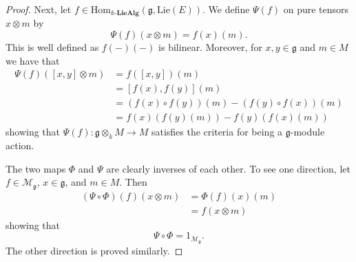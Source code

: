 \begin{proof}
  Next, let $ f \in \text{Hom}_{k\text{-}\mathbf{LieAlg}}(\mathfrak{g}, \text{Lie}(E)) $. We define $ \Psi(f) $ on pure tensors $ x \otimes m $ by
  \begin{equation}
    \Psi(f)(x \otimes m) = f(x)(m).
  \end{equation}
  This is well defined as $ f(-)(-) $ is bilinear. Moreover, for $ x,y \in \mathfrak{g} $ and $ m \in M $ we have that
  \begin{align*}
    \Psi(f)([x,y] \otimes m) &= f([x,y])(m) \\
                             &= [f(x), f(y)](m) \\
                             &= (f(x)\circ f(y))(m) - (f(y)\circ f(x))(m) \\
                             &= f(x)(f(y)(m)) - f(y)(f(x)(m))
  \end{align*}
  showing that $ \Psi(f): \mathfrak{g} \otimes_k M \to M $ satisfies the criteria for being a $ \mathfrak{g} $-module action.

  The two maps $ \Phi $ and $ \Psi $ are clearly inverses of each other. To see one direction, let $ f \in \mathcal{M}_\mathfrak{g} $, $ x \in \mathfrak{g} $, and $ m \in M $. Then
  \begin{align*}
    (\Psi \circ \Phi)(f)(x \otimes m) &= \Phi(f)(x)(m) \\
                                      &= f(x \otimes m)
  \end{align*}
  showing that
  \begin{equation}
    \Psi \circ \Phi = 1_{\mathcal{M}_{\mathfrak{g}}}.
  \end{equation}
  The other direction is proved similarly.


\end{proof}
